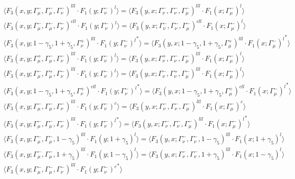 \begin{align*}
&\Big\langle F_3(x,y;\Gamma_\mu^-,\Gamma_\mu^-,\Gamma_\nu^-)^{lll} \cdot F_1(y;\Gamma_\nu^-)^l\Big\rangle
=\Big\langle F_3(y,x;\Gamma_\nu^-,\Gamma_\nu^-,\Gamma_\mu^-)^{lll} \cdot F_1(x;\Gamma_\mu^-)^l\Big\rangle\\
&\Big\langle F_3(x,y;\Gamma_\mu^-,\Gamma_\mu^-,\Gamma_\nu^-)^{cll} \cdot F_1(y;\Gamma_\nu^-)^l\Big\rangle
=\Big\langle F_3(y,x;\Gamma_\nu^-,\Gamma_\nu^-,\Gamma_\mu^-)^{cll} \cdot F_1(x;\Gamma_\mu^-)^l\Big\rangle\\
&\Big\langle F_3(x,y;1-\gamma_5,1+\gamma_5,\Gamma_\nu^+)^{lll} \cdot {F_1(y;\Gamma_\nu^-)^l}^*\Big\rangle
=\Big\langle F_3(y,x;1-\gamma_5,1+\gamma_5,\Gamma_\mu^+)^{lll} \cdot {F_1(x;\Gamma_\mu^-)^l}^*\Big\rangle\\
&\Big\langle F_3(x,y;\Gamma_\mu^+,\Gamma_\mu^-,\Gamma_\nu^-)^{lll} \cdot F_1(y;\Gamma_\nu^-)^l\Big\rangle
=\Big\langle F_3(y,x;\Gamma_\nu^+,\Gamma_\nu^-,\Gamma_\mu^-)^{lll} \cdot F_1(x;\Gamma_\mu^-)^l\Big\rangle\\
&\Big\langle F_3(x,y;\Gamma_\mu^-,\Gamma_\mu^+,\Gamma_\nu^-)^{lll} \cdot F_1(y;\Gamma_\nu^-)^l\Big\rangle
=\Big\langle F_3(y,x;\Gamma_\nu^-,\Gamma_\nu^+,\Gamma_\mu^-)^{lll} \cdot F_1(x;\Gamma_\mu^-)^l\Big\rangle\\
&\Big\langle F_3(x,y;1-\gamma_5,1+\gamma_5,\Gamma_\nu^+)^{cll} \cdot {F_1(y;\Gamma_\nu^-)^l}^*\Big\rangle
=\Big\langle F_3(y,x;1-\gamma_5,1+\gamma_5,\Gamma_\mu^+)^{cll} \cdot {F_1(x;\Gamma_\mu^-)^l}^*\Big\rangle\\
&\Big\langle F_3(x,y;\Gamma_\mu^-,\Gamma_\mu^-,\Gamma_\nu^-)^{lll} \cdot F_1(y;\Gamma_\nu^-)^c\Big\rangle
=\Big\langle F_3(y,x;\Gamma_\nu^-,\Gamma_\nu^-,\Gamma_\mu^-)^{lll} \cdot F_1(x;\Gamma_\mu^-)^c\Big\rangle\\
&\Big\langle F_3(x,y;\Gamma_\mu^-,\Gamma_\mu^-,\Gamma_\nu^-)^{lll} \cdot {F_1(y;\Gamma_\nu^-)^l}^*\Big\rangle
=\Big\langle F_3(y,x;\Gamma_\nu^-,\Gamma_\nu^-,\Gamma_\mu^-)^{lll} \cdot {F_1(x;\Gamma_\mu^-)^l}^*\Big\rangle\\
&\Big\langle F_3(x,y;\Gamma_\mu^-,\Gamma_\mu^-,1-\gamma_5)^{lll} \cdot F_1(y;1+\gamma_5)^l\Big\rangle
=\Big\langle F_3(y,x;\Gamma_\nu^-,\Gamma_\nu^-,1-\gamma_5)^{lll} \cdot F_1(x;1+\gamma_5)^l\Big\rangle\\
&\Big\langle F_3(x,y;\Gamma_\mu^-,\Gamma_\mu^-,1+\gamma_5)^{lll} \cdot F_1(y;1-\gamma_5)^l\Big\rangle
=\Big\langle F_3(y,x;\Gamma_\nu^-,\Gamma_\nu^-,1+\gamma_5)^{lll} \cdot F_1(x;1-\gamma_5)^l\Big\rangle\\
&\Big\langle F_3(x,y;\Gamma_\mu^-,\Gamma_\mu^-,\Gamma_\nu^-)^{lll} \cdot {F_1(y;\Gamma_\nu^-)^c}^*\Big\rangle

\end{align*}
